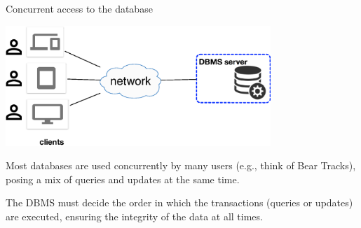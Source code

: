 

%
%
\begin{frame}{Concurrent access to the database}
\begin{center}
\includegraphics[width=0.75\textwidth]{../lec03_hardware/figures/client_server_cloud}
\end{center}

Most databases are used concurrently by many users (e.g., think of Bear Tracks), posing a mix of queries and updates at the same time.

The DBMS must decide the order in which the transactions (queries or updates) are executed, ensuring the integrity of the data at all times.

\end{frame}

\newsavebox\serialExecutionTimeline
{}

\newsavebox\serialExecutionTimelineII
{}


